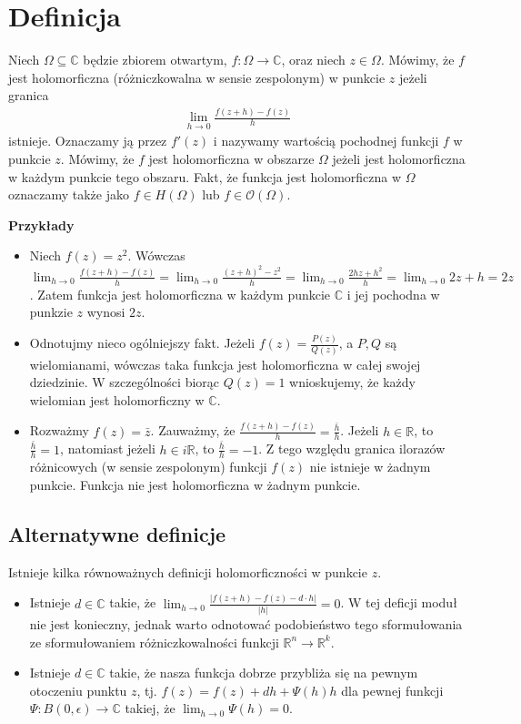 \section{Definicja}
Niech $\Omega \subseteq \mathbb{C}$ będzie zbiorem otwartym, $f : \Omega \to \mathbb {C}$, oraz niech $z \in \Omega$. Mówimy,  że $f$ jest holomorficzna (różniczkowalna w sensie zespolonym) w punkcie $z$ jeżeli granica
\begin{align*}
	\lim_{h\to0} \frac{f(z+h)-f(z)}{h}
\end{align*}
istnieje. Oznaczamy ją przez $f'(z)$ i nazywamy wartością pochodnej funkcji $f$ w punkcie $z$. Mówimy, że $f$ jest holomorficzna w obszarze $\Omega$ jeżeli jest holomorficzna w każdym punkcie tego obszaru. Fakt, że funkcja jest holomorficzna w $\Omega$ oznaczamy także jako $f \in H(\Omega)$ lub $f \in \mathcal{O}(\Omega)$.

\textbf{Przykłady}
\begin{itemize}
	\item Niech $f(z) = z^2$. Wówczas $\lim_{h\to 0} \frac{f(z+h)-f(z)}{h} = \lim_{h\to 0} \frac{(z+h)^2-z^2}{h} = \lim_{h\to 0} \frac{2hz+h^2}{h} = \lim_{h\to 0} 2z+h = 2z$. Zatem funkcja jest holomorficzna w każdym punkcie $\mathbb{C}$ i jej pochodna w punkzie $z$ wynosi $2z$.
	\item Odnotujmy nieco ogólniejszy fakt. Jeżeli $f(z) = \frac{P(z)}{Q(z)}$, a $P, Q$ są wielomianami, wówczas taka funkcja jest holomorficzna w całej swojej dziedzinie. W szczególności biorąc $Q(z) = 1$ wnioskujemy, że każdy wielomian jest holomorficzny w $\mathbb{C}$.
	\item Rozważmy $f(z) = \bar{z}$. Zauważmy, że $\frac{f(z+h)-f(z)}{h} = \frac{\bar{h}}{h}$. Jeżeli $h \in \mathbb{R}$, to $\frac{\bar{h}}{h} =  1$, natomiast jeżeli $h \in i\mathbb{R}$, to $\frac{\bar{h}}{h} = -1$. Z tego względu granica ilorazów różnicowych (w sensie zespolonym) funkcji $f(z)$ nie istnieje w żadnym punkcie. Funkcja nie jest holomorficzna w żadnym punkcie.
\end{itemize}

\subsection{Alternatywne definicje}
Istnieje kilka równoważnych definicji holomorficzności w punkcie $z$.
\begin{itemize}
	\item Istnieje $d \in \mathbb{C}$ takie, że $\lim_{h\to 0} \frac{|f(z+h)-f(z)-d\cdot h|}{|h|} = 0$.
		W tej deficji moduł nie jest konieczny, jednak warto odnotować podobieństwo tego sformułowania ze sformułowaniem różniczkowalności funkcji $\mathbb{R}^n \to \mathbb{R}^k$.

	\item Istnieje $d \in \mathbb{C}$ takie, że nasza funkcja dobrze przybliża się na pewnym otoczeniu punktu $z$, tj. $f(z) = f(z) + dh + \Psi(h)h$ dla pewnej funkcji $\Psi : B(0,\epsilon) \to \mathbb{C}$ takiej, że $\lim_{h \to 0} \Psi(h) = 0$. 
\end{itemize}

